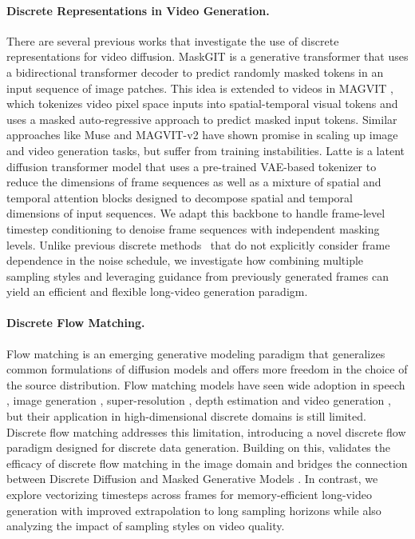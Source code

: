 \paragraph{Discrete Representations in Video Generation.}
There are several previous works that investigate the use of discrete representations for video diffusion. MaskGIT \cite{chang2022maskgit} is a generative transformer that uses a bidirectional transformer decoder to predict randomly masked tokens in an input sequence of image patches. This idea is extended to videos in MAGVIT \cite{yu2023magvit}, which tokenizes video pixel space inputs into spatial-temporal visual tokens and uses a masked auto-regressive approach to predict masked input tokens. Similar approaches like Muse \cite{Chang2023MuseTG} and MAGVIT-v2\cite{yu2023language_magvit2} have shown promise in scaling up image and video generation tasks, but suffer from training instabilities. Latte \cite{ma2024latte} is a latent diffusion transformer model that uses a pre-trained VAE-based tokenizer to reduce the dimensions of frame sequences as well as a mixture of spatial and temporal attention blocks designed to decompose spatial and temporal dimensions of input sequences. We adapt this backbone to handle frame-level timestep conditioning to denoise frame sequences with independent masking levels. Unlike previous discrete methods~\cite{hu2024maskneed,ma2024latte} that do not explicitly consider frame dependence in the noise schedule, we investigate how combining multiple sampling styles and leveraging guidance from previously generated frames can yield an efficient and flexible long-video generation paradigm.

\paragraph{Discrete Flow Matching.}
Flow matching \cite{lipman2022flow} is an emerging generative modeling paradigm that generalizes common formulations of diffusion models and offers more freedom in the choice of the source distribution. Flow matching models have seen wide adoption in speech \cite{liu2023generative}, image generation \cite{hu2024zigma,hulfm,dao2023flow, lipman2022flow}, super-resolution \cite{schusterbauer2024boosting}, depth estimation \cite{gui2024depthfm} and video generation \cite{jin2024pyramidal}, but their application in high-dimensional discrete domains is still limited. Discrete flow matching \cite{gat2024discrete,campbell2024generative,shi2024simplifiedgeneralizedmaskeddiffusion,sahoo2024simpleeffectivemaskeddiffusion} addresses this limitation, introducing a novel discrete flow paradigm designed for discrete data generation. Building on this, \citet{hu2024maskneed} validates the efficacy of discrete flow matching in the image domain and bridges the connection between Discrete Diffusion and Masked Generative Models \cite{chang2022maskgit}. %
In contrast, we explore vectorizing timesteps across frames for memory-efficient long-video generation with improved extrapolation to long sampling horizons while also analyzing the impact of sampling styles on video quality.


